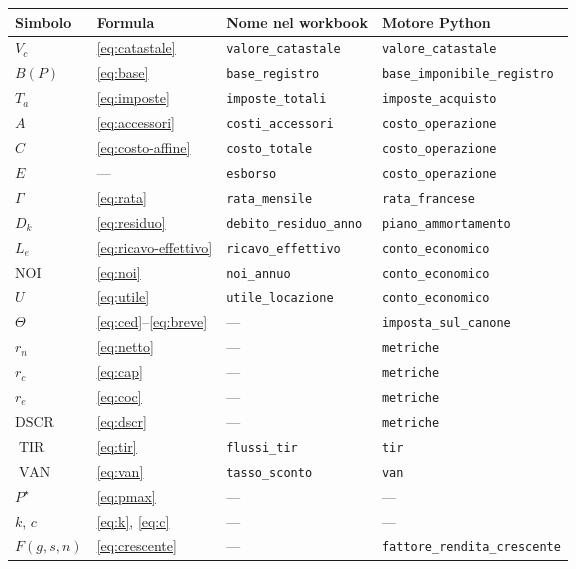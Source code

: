 \documentclass[11pt,a4paper]{article}
\theoremstyle{definition}
\theoremstyle{plain}
\DeclareMathOperator{\VAN}{VAN}
\DeclareMathOperator{\TIR}{TIR}
\begin{document}
\begin{table}[H]
\centering
\small
\begin{tabular}{@{}llll@{}}
\toprule
Simbolo & Formula & Nome nel workbook & Motore Python \\
\midrule
$V_c$ & \eqref{eq:catastale} & \texttt{valore\_catastale} & \texttt{valore\_catastale} \\
$B(P)$ & \eqref{eq:base} & \texttt{base\_registro} & \texttt{base\_imponibile\_registro} \\
$T_a$ & \eqref{eq:imposte} & \texttt{imposte\_totali} & \texttt{imposte\_acquisto} \\
$A$ & \eqref{eq:accessori} & \texttt{costi\_accessori} & \texttt{costo\_operazione} \\
$C$ & \eqref{eq:costo-affine} & \texttt{costo\_totale} & \texttt{costo\_operazione} \\
$E$ & --- & \texttt{esborso} & \texttt{costo\_operazione} \\
$\Gamma$ & \eqref{eq:rata} & \texttt{rata\_mensile} & \texttt{rata\_francese} \\
$D_k$ & \eqref{eq:residuo} & \texttt{debito\_residuo\_anno} & \texttt{piano\_ammortamento} \\
$L_e$ & \eqref{eq:ricavo-effettivo} & \texttt{ricavo\_effettivo} & \texttt{conto\_economico} \\
$\mathrm{NOI}$ & \eqref{eq:noi} & \texttt{noi\_annuo} & \texttt{conto\_economico} \\
$U$ & \eqref{eq:utile} & \texttt{utile\_locazione} & \texttt{conto\_economico} \\
$\Theta$ & \eqref{eq:ced}--\eqref{eq:breve} & --- & \texttt{imposta\_sul\_canone} \\
$r_n$ & \eqref{eq:netto} & --- & \texttt{metriche} \\
$r_c$ & \eqref{eq:cap} & --- & \texttt{metriche} \\
$r_e$ & \eqref{eq:coc} & --- & \texttt{metriche} \\
$\mathrm{DSCR}$ & \eqref{eq:dscr} & --- & \texttt{metriche} \\
$\TIR$ & \eqref{eq:tir} & \texttt{flussi\_tir} & \texttt{tir} \\
$\VAN$ & \eqref{eq:van} & \texttt{tasso\_sconto} & \texttt{van} \\
$P^\star$ & \eqref{eq:pmax} & --- & --- \\
$k$, $c$ & \eqref{eq:k}, \eqref{eq:c} & --- & --- \\
$F(g,s,n)$ & \eqref{eq:crescente} & --- & \texttt{fattore\_rendita\_crescente} \\

\end{tabular}
\end{table}
\end{document}
